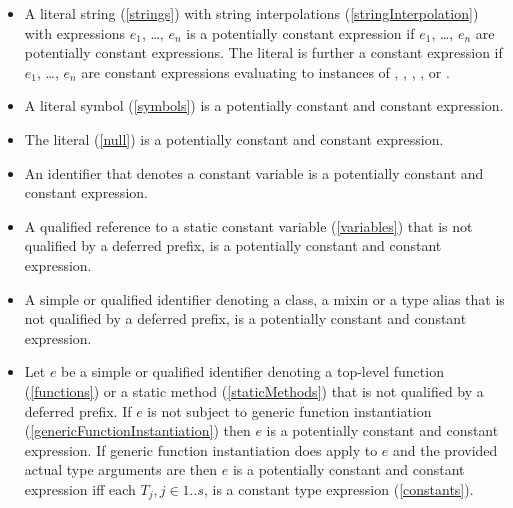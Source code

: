 \documentclass[makeidx]{article}
\begin{document}
{\begin{itemize}
\item A literal string (\ref{strings}) with string interpolations
  (\ref{stringInterpolation})
  with expressions $e_1$, \ldots, $e_n$ is a potentially constant expression
  if $e_1$, \ldots, $e_n$ are potentially constant expressions.
  The literal is further a constant expression
  if $e_1$, \ldots, $e_n$ are constant expressions
  evaluating to instances of , ,
  , , or .

\item
  A literal symbol (\ref{symbols}) is
  a potentially constant and constant expression.

\item
  The literal \NULL{} (\ref{null}) is
  a potentially constant and constant expression.

\item
  An identifier that denotes a constant variable is
  a potentially constant and constant expression.

\item
  A qualified reference to a static constant variable
  (\ref{variables})
  that is not qualified by a deferred prefix,
  is a potentially constant and constant expression.

\item
  A simple or qualified identifier denoting a class,
  a mixin or a type alias that is not qualified by a deferred prefix,
  is a potentially constant and constant expression.

\item
  Let $e$ be a simple or qualified identifier denoting
  a top-level function (\ref{functions})
  or a static method (\ref{staticMethods})
  that is not qualified by a deferred prefix.
  If $e$ is not subject to generic function instantiation
  (\ref{genericFunctionInstantiation})
  then $e$ is a potentially constant and constant expression.
  If generic function instantiation does apply to $e$
  and the provided actual type arguments are 
  then $e$ is a potentially constant and constant expression
  if{}f each $T_j, j \in 1 .. s$, is a constant type expression
  (\ref{constants}).


\end{itemize}}
\end{document}
